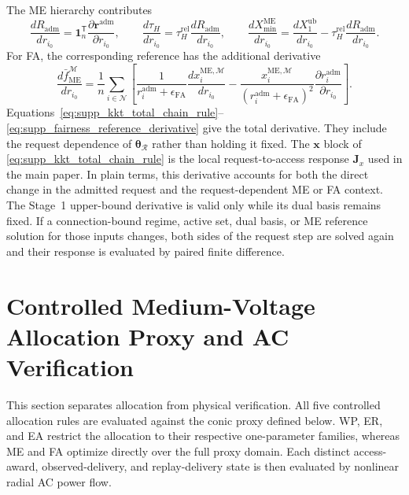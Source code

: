 \documentclass[11pt]{article}
\begin{document}
The ME hierarchy contributes
\begin{equation}
\frac{dR_{\mathrm{adm}}}{dr_{i_0}}=\mathbf 1_n^{\mathsf T}
\frac{\partial\mathbf r^{\mathrm{adm}}}{\partial r_{i_0}},
\qquad
\frac{d\tau_H}{dr_{i_0}}=\tau_H^{\mathrm{rel}}
\frac{dR_{\mathrm{adm}}}{dr_{i_0}},
\qquad
\frac{dX_{\min}^{\mathrm{ME}}}{dr_{i_0}}=\frac{dX_1^{\mathrm{ub}}}{dr_{i_0}}
-\tau_H^{\mathrm{rel}}\frac{dR_{\mathrm{adm}}}{dr_{i_0}}.
\label{eq:supp_hierarchy_derivative}
\end{equation}
For FA, the corresponding reference has the additional derivative
\begin{equation}
\frac{d\bar f_{\mathrm{ME}}^{\mathcal M}}{dr_{i_0}}
=\frac{1}{n}\sum_{i\in\mathcal N}
\left[
\frac{1}{r_i^{\mathrm{adm}}+\epsilon_{\mathrm{FA}}}
\frac{dx_i^{\mathrm{ME},\mathcal M}}{dr_{i_0}}
-\frac{x_i^{\mathrm{ME},\mathcal M}}
{(r_i^{\mathrm{adm}}+\epsilon_{\mathrm{FA}})^2}
\frac{\partial r_i^{\mathrm{adm}}}{\partial r_{i_0}}
\right].
\label{eq:supp_fairness_reference_derivative}
\end{equation}
Equations~\eqref{eq:supp_kkt_total_chain_rule}--
\eqref{eq:supp_fairness_reference_derivative} give the total derivative. They
include the request dependence of $\boldsymbol\theta_{\mathcal R}$ rather than
holding it fixed. The $\mathbf x$ block of
\eqref{eq:supp_kkt_total_chain_rule} is the local request-to-access response
$\mathbf J_x$ used in the main paper. In plain terms, this derivative accounts
for both the direct change in the admitted request and the request-dependent ME
or FA context. The Stage~1 upper-bound derivative is valid only while its dual
basis remains fixed. If a connection-bound regime, active set, dual basis, or
ME reference solution for those inputs changes, both sides of the request step are
solved again and their response is evaluated by paired finite difference.

\section{Controlled Medium-Voltage Allocation Proxy and AC Verification}
\label{supp:implemented_socp}

This section separates allocation from physical verification. All five
controlled allocation rules are evaluated against the conic proxy defined
below. WP, ER, and EA restrict the allocation to their respective one-parameter
families, whereas ME and FA optimize directly over the full proxy domain. Each
distinct access-award, observed-delivery, and replay-delivery state is then
evaluated by nonlinear radial AC power flow.
\end{document}
